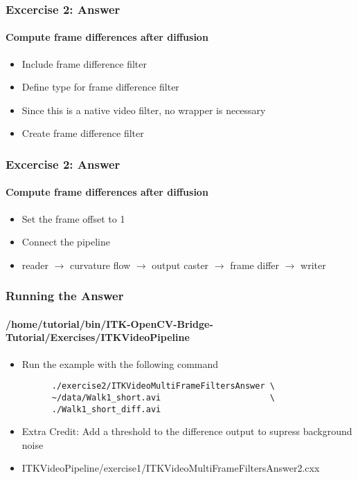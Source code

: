 {
\begin{frame}[fragile]
\frametitle{Excercise 2: Answer}
\framesubtitle{Compute frame differences after diffusion}
\begin{itemize}
\item Include frame difference filter
\pause

\item Define type for frame difference filter
\item Since this is a native video filter, no wrapper is necessary
\pause

\item Create frame difference filter
\end{itemize}
\end{frame}
}

{
\begin{frame}[fragile]
\frametitle{Excercise 2: Answer}
\framesubtitle{Compute frame differences after diffusion}
\begin{itemize}
\item Set the frame offset to 1
\pause

\item Connect the pipeline
\item reader $\rightarrow$ curvature flow $\rightarrow$ output caster
  $\rightarrow$ frame differ $\rightarrow$ writer
\end{itemize}
\end{frame}
}

{
\begin{frame}[fragile]
\frametitle{Running the Answer}
\framesubtitle{/home/tutorial/bin/ITK-OpenCV-Bridge-Tutorial/Exercises/ITKVideoPipeline}
\begin{itemize}
\item Run the example with the following command
\begin{verbatim}
      ./exercise2/ITKVideoMultiFrameFiltersAnswer \
      ~/data/Walk1_short.avi                      \
      ./Walk1_short_diff.avi 
\end{verbatim}

\item Extra Credit: Add a threshold to the difference output to supress
  background noise
\item {\footnotesize ITKVideoPipeline/exercise1/ITKVideoMultiFrameFiltersAnswer2.cxx}
\end{itemize}
\end{frame}
}
